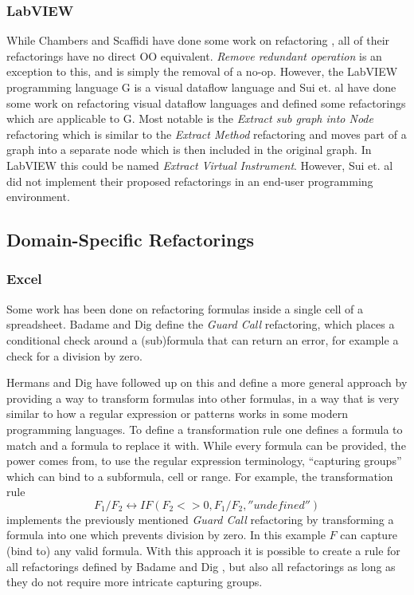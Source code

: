 \documentclass[10pt,conference,compsocconf]{IEEEtran}
\begin{document}
\subsubsection{LabVIEW}

While Chambers and Scaffidi have done some work on refactoring \cite{chambers2015impact}, all of their refactorings have no direct OO equivalent. \emph{Remove redundant operation} is an exception to this, and is simply the removal of a no-op.
However, the LabVIEW programming language G is a visual dataflow language and
Sui et. al \cite{sui2008automated} have done some work on refactoring visual dataflow languages and defined some refactorings which are applicable to G.
Most notable is the \textit{Extract sub graph into Node} refactoring which is similar to the \textit{Extract Method} refactoring and moves part of a graph into a separate node which is then included in the original graph.
In LabVIEW this could be named \textit{Extract Virtual Instrument}.
However, Sui et. al did not implement their proposed refactorings in an end-user programming environment.

\subsection{Domain-Specific Refactorings}

\subsubsection{Excel}

Some work has been done on refactoring formulas inside a single cell of a spreadsheet. Badame and Dig \cite{badame2012refactoring} define the \textit{Guard Call} refactoring, which places a conditional check around a (sub)formula that can return an error, for example a check for a division by zero.

Hermans and Dig \cite{hermans2014bumblebee} have followed up on this and define a more general approach by providing a way to transform formulas into other formulas, in a way that is very similar to how a regular expression or patterns works in some modern programming languages.
To define a transformation rule one defines a formula to match and a formula to replace it with. While every formula can be provided, the power comes from, to use the regular expression terminology, ``capturing groups'' which can bind to a subformula, cell or range. For example, the transformation rule
\[F_1/F_2 \leftrightarrow IF(F_2<>0,F_1/F_2,''undefined'')\]
 implements the previously mentioned \textit{Guard Call} \cite{badame2012refactoring} refactoring by transforming a formula into one which prevents division by zero.
 In this example $F$ can capture (bind to) any valid formula.
 With this approach it is possible to create a rule for all refactorings defined by Badame and Dig \cite{badame2012refactoring}, but also all refactorings as long as they do not require more intricate capturing groups.
\end{document}
